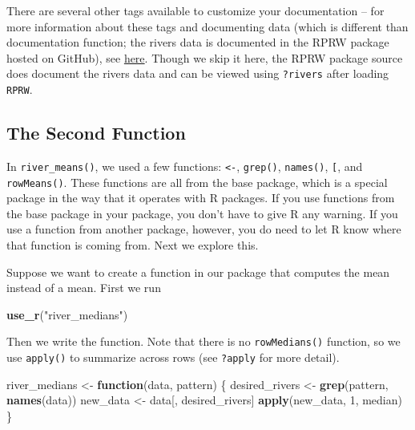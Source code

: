 \documentclass[
]{book}
\newenvironment{Shaded}{\begin{snugshade}}{\end{snugshade}}
\newcommand{\ControlFlowTok}[1]{\textcolor[rgb]{0.13,0.29,0.53}{\textbf{#1}}}
\newcommand{\DecValTok}[1]{\textcolor[rgb]{0.00,0.00,0.81}{#1}}
\newcommand{\KeywordTok}[1]{\textcolor[rgb]{0.13,0.29,0.53}{\textbf{#1}}}
\newcommand{\NormalTok}[1]{#1}
\newcommand{\StringTok}[1]{\textcolor[rgb]{0.31,0.60,0.02}{#1}}
\begin{document}
There are several other tags available to customize your documentation -- for more information about these tags and documenting data (which is different than documentation function; the rivers data is documented in the RPRW package hosted on GitHub), see \href{https://r-pkgs.org/man.html\#man}{here}. Though we skip it here, the RPRW package source does document the rivers data and can be viewed using \texttt{?rivers} after loading \texttt{RPRW}.

\hypertarget{the-second-function}{%
\subsection{The Second Function}\label{the-second-function}}

In \texttt{river\_means()}, we used a few functions: \texttt{\textless{}-}, \texttt{grep()}, \texttt{names()}, \texttt{{[}}, and \texttt{rowMeans()}. These functions are all from the base package, which is a special package in the way that it operates with R packages. If you use functions from the base package in your package, you don't have to give R any warning. If you use a function from another package, however, you do need to let R know where that function is coming from. Next we explore this.

Suppose we want to create a function in our package that computes the mean instead of a mean. First we run

\begin{Shaded}
\begin{Highlighting}[]
\KeywordTok{use_r}\NormalTok{(}\StringTok{"river_medians"}\NormalTok{)}
\end{Highlighting}
\end{Shaded}

Then we write the function. Note that there is no \texttt{rowMedians()} function, so we use \texttt{apply()} to summarize across rows (see \texttt{?apply} for more detail).

\begin{Shaded}
\begin{Highlighting}[]
\NormalTok{river_medians <-}\StringTok{ }\ControlFlowTok{function}\NormalTok{(data, pattern) \{}
\NormalTok{  desired_rivers <-}\StringTok{ }\KeywordTok{grep}\NormalTok{(pattern, }\KeywordTok{names}\NormalTok{(data))}
\NormalTok{  new_data <-}\StringTok{ }\NormalTok{data[, desired_rivers]}
  \KeywordTok{apply}\NormalTok{(new_data, }\DecValTok{1}\NormalTok{, median)}
\NormalTok{\}}
\end{Highlighting}
\end{Shaded}
\end{document}
